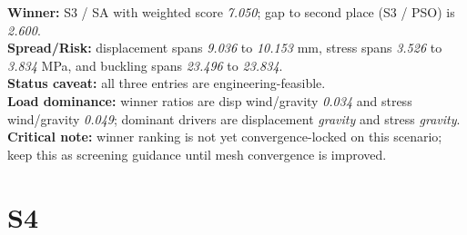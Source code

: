 \begin{table}[H]
\centering
\scriptsize
\setlength{\tabcolsep}{4pt}
\renewcommand{\arraystretch}{1.1}
\end{table}


\begin{samepage}
\noindent \textbf{Winner:} S3 / SA with weighted score \textit{7.050}; gap to second place (S3 / PSO) is \textit{2.600}.\\
\noindent \textbf{Spread/Risk:} displacement spans \textit{9.036} to \textit{10.153} mm, stress spans \textit{3.526} to \textit{3.834} MPa, and buckling spans \textit{23.496} to \textit{23.834}.\\
\noindent \textbf{Status caveat:} all three entries are engineering-feasible.\\
\noindent \textbf{Load dominance:} winner ratios are disp wind/gravity \textit{0.034} and stress wind/gravity \textit{0.049}; dominant drivers are displacement \textit{gravity} and stress \textit{gravity}.\\
\noindent \textbf{Critical note:} winner ranking is not yet convergence-locked on this scenario; keep this as screening guidance until mesh convergence is improved.
\end{samepage}


\section{S4}


\begin{table}[H]
\centering
\scriptsize
\setlength{\tabcolsep}{4pt}
\renewcommand{\arraystretch}{1.1}
\end{table}


